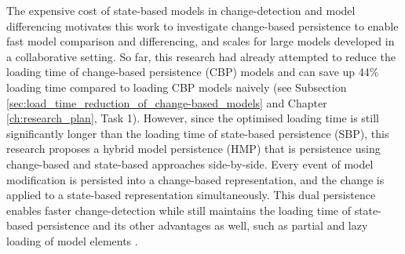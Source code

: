 \documentclass[12pt, a4paper]{report} \usepackage[titletoc]{appendix}
\begin{document}
The expensive cost of state-based models in change-detection and model differencing motivates this work to investigate change-based persistence to enable fast model comparison and differencing, and scales for large models developed in a collaborative setting. So far, this research had already attempted to reduce the loading time of change-based persistence (CBP) models and can save up 44\% loading time compared to loading CBP models naively (see Subsection \ref{sec:load_time_reduction_of_change-based_models} and Chapter \ref{ch:research_plan}, Task 1). However, since the optimised loading time is still significantly longer than the loading time of state-based persistence (SBP), this research proposes a hybrid model persistence (HMP) that is persistence using change-based and state-based approaches side-by-side. Every event of model modification is persisted into a change-based representation, and the change is applied to a state-based representation simultaneously. This dual persistence enables faster change-detection while still maintains the loading time of state-based persistence and its other advantages as well, such as partial and lazy loading of model elements \cite{ran2016partial,daniel2016neoemf}.  
\end{document}
